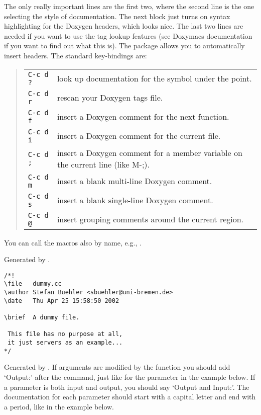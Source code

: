 The only really important lines are the first two, where the second
line is the one selecting the style of documentation. The next block
just turns on syntax highlighting for the Doxygen headers, which looks
nice. The last two lines are needed if you want to use the tag lookup
features (see Doxymacs documentation if you want to find out what this
is).  The package allows you to automatically insert headers. The
standard key-bindings are:
\begin{quote}
\begin{tabularx}{.8\hsize}{@{}lX}
\texttt{C-c d ?} & look up documentation for the symbol under the point.\\
\texttt{C-c d r} & rescan your Doxygen tags file.\\
\texttt{C-c d f} & insert a Doxygen comment for the next function.\\
\texttt{C-c d i} & insert a Doxygen comment for the current file.\\
\texttt{C-c d ;} & insert a Doxygen comment for a member variable on the current line (like M-;).\\
\texttt{C-c d m} & insert a blank multi-line Doxygen comment.\\
\texttt{C-c d s} & insert a blank single-line Doxygen comment.\\
\texttt{C-c d @} & insert grouping comments around the current region.\\
\end{tabularx}
\end{quote}
You can call the macros also by name, e.g., .


Generated by .

\begin{verbatim}
/*!
\file   dummy.cc
\author Stefan Buehler <sbuehler@uni-bremen.de>
\date   Thu Apr 25 15:58:50 2002

\brief  A dummy file.

 This file has no purpose at all,
 it just servers as an example... 
*/
\end{verbatim}


Generated by .
If arguments are modified by the function you should
add `Output:' after the \artsstyle{\\param} command, just like for the
parameter  in the example below. If a parameter is both input
and output, you should say `Output and Input:'. The documentation for
each parameter should start with a capital letter and end with a
period, like in the example below.

